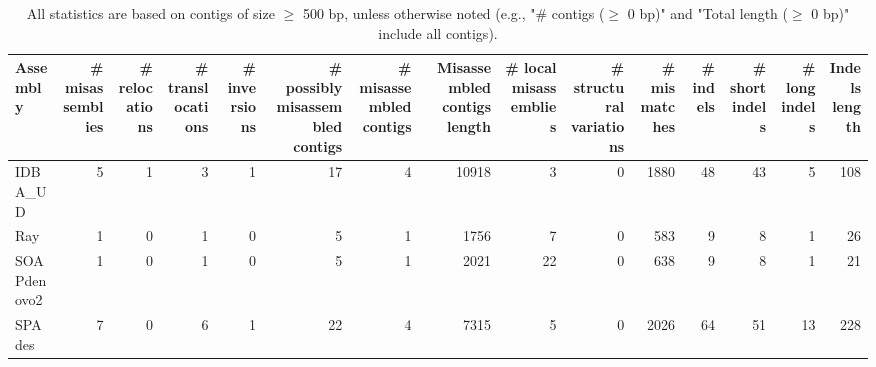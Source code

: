 \documentclass[12pt,a4paper]{article}
\begin{document}
\begin{table}[ht]
\begin{center}
\caption{All statistics are based on contigs of size $\geq$ 500 bp, unless otherwise noted (e.g., "\# contigs ($\geq$ 0 bp)" and "Total length ($\geq$ 0 bp)" include all contigs).}
\begin{tabular}{|l*{14}{|r}|}
\hline
Assembly & \# misassemblies &     \# relocations &     \# translocations &     \# inversions & \# possibly misassembled contigs & \# misassembled contigs & Misassembled contigs length & \# local misassemblies & \# structural variations & \# mismatches & \# indels &     \# short indels &     \# long indels & Indels length \\ \hline
IDBA\_UD & 5 & 1 & 3 & 1 & 17 & 4 & 10918 & 3 & 0 & 1880 & 48 & 43 & 5 & 108 \\ \hline
Ray & 1 & 0 & 1 & 0 & 5 & 1 & 1756 & 7 & 0 & 583 & 9 & 8 & 1 & 26 \\ \hline
SOAPdenovo2 & 1 & 0 & 1 & 0 & 5 & 1 & 2021 & 22 & 0 & 638 & 9 & 8 & 1 & 21 \\ \hline
SPAdes & 7 & 0 & 6 & 1 & 22 & 4 & 7315 & 5 & 0 & 2026 & 64 & 51 & 13 & 228 \\ \hline
\end{tabular}
\end{center}
\end{table}
\end{document}
